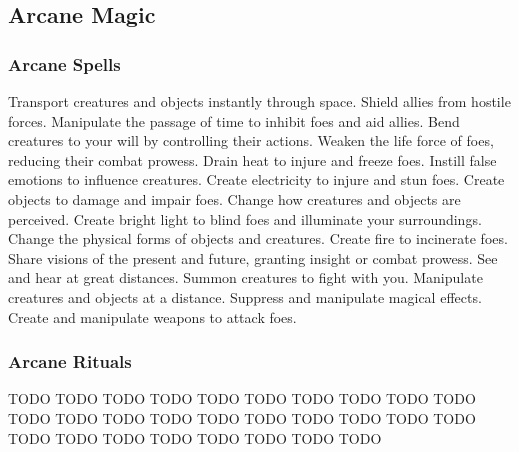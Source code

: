 
\small
\subsection{Arcane Magic}\label{Arcane Magic}
\subsubsection{Arcane Spells}\label{Arcane Spells}
\begin{spelllist}
 Transport creatures and objects instantly through space.
 Shield allies from hostile forces.
 Manipulate the passage of time to inhibit foes and aid allies.
 Bend creatures to your will by controlling their actions.
 Weaken the life force of foes, reducing their combat prowess.
 Drain heat to injure and freeze foes.
 Instill false emotions to influence creatures.
 Create electricity to injure and stun foes.
 Create objects to damage and impair foes.
 Change how creatures and objects are perceived.
 Create bright light to blind foes and illuminate your surroundings.
 Change the physical forms of objects and creatures.
 Create fire to incinerate foes.
 Share visions of the present and future, granting insight or combat prowess.
 See and hear at great distances.
 Summon creatures to fight with you.
 Manipulate creatures and objects at a distance.
 Suppress and manipulate magical effects.
 Create and manipulate weapons to attack foes.
\end{spelllist}
\subsubsection{Arcane Rituals}\label{Arcane Rituals}
\begin{spelllist}
 TODO
 TODO
 TODO
 TODO
 TODO
 TODO
 TODO
 TODO
 TODO
 TODO
 TODO
 TODO
 TODO
 TODO
 TODO
 TODO
 TODO
 TODO
 TODO
 TODO
 TODO
 TODO
 TODO
 TODO
 TODO
 TODO
 TODO
 TODO
\end{spelllist}




